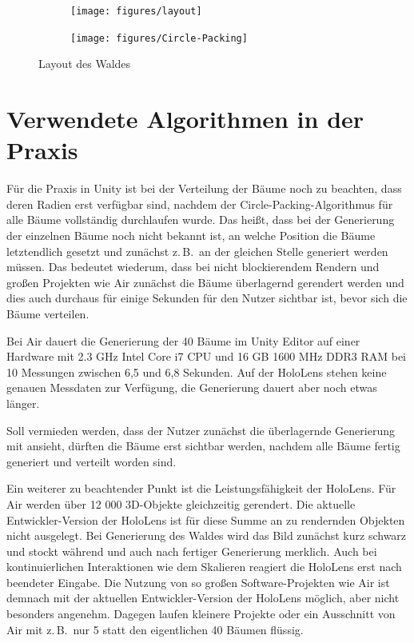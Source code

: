 \begin{figure}[htbp]
  \centering
  \begin{subfigure}[t]{\textwidth}
    \centering
    \texttt{[image: figures/layout]}
     \label{fig:layout-side}
  \end{subfigure}
  \par\bigskip
  \begin{subfigure}[t]{\textwidth}
    \centering
  	\texttt{[image: figures/Circle-Packing]}
  	 \label{fig:layout-top}
  \end{subfigure}
  \caption{Layout des Waldes} \label{fig:layout}
\end{figure}

\section{Verwendete Algorithmen in der Praxis}

Für die Praxis in Unity ist bei der Verteilung der Bäume noch zu beachten, dass deren Radien erst verfügbar sind, nachdem der Circle-Packing-Algorithmus für alle Bäume vollständig durchlaufen wurde. Das heißt, dass bei der Generierung der einzelnen Bäume noch nicht bekannt ist, an welche Position die Bäume letztendlich gesetzt und zunächst z.\,B.\ an der gleichen Stelle generiert werden müssen. Das bedeutet wiederum, dass bei nicht blockierendem Rendern und großen Projekten wie Air zunächst die Bäume überlagernd gerendert werden und dies auch durchaus für einige Sekunden für den Nutzer sichtbar ist, bevor sich die Bäume verteilen.

Bei Air dauert die Generierung der 40 Bäume im Unity Editor auf einer Hardware mit 2.3 GHz Intel Core i7 CPU und 16 GB 1600 MHz DDR3 RAM bei 10 Messungen zwischen 6,5 und 6,8 Sekunden. Auf der HoloLens stehen keine genauen Messdaten zur Verfügung, die Generierung dauert aber noch etwas länger.

Soll vermieden werden, dass der Nutzer zunächst die überlagernde Generierung mit ansieht, dürften die Bäume erst sichtbar werden, nachdem alle Bäume fertig generiert und verteilt worden sind.

Ein weiterer zu beachtender Punkt ist die Leistungsfähigkeit der HoloLens. Für Air werden über 12 000 3D-Objekte gleichzeitig gerendert. Die aktuelle Entwickler-Version der HoloLens ist für diese Summe an zu rendernden Objekten nicht ausgelegt. Bei Generierung des Waldes wird das Bild zunächst kurz schwarz und stockt während und auch nach fertiger Generierung merklich. Auch bei kontinuierlichen Interaktionen wie dem Skalieren reagiert die HoloLens erst nach beendeter Eingabe. Die Nutzung von so großen Software-Projekten wie Air ist demnach mit der aktuellen Entwickler-Version der HoloLens möglich, aber nicht besonders angenehm. Dagegen laufen kleinere Projekte oder ein Ausschnitt von Air mit z.\,B.\ nur 5 statt den eigentlichen 40 Bäumen flüssig.

